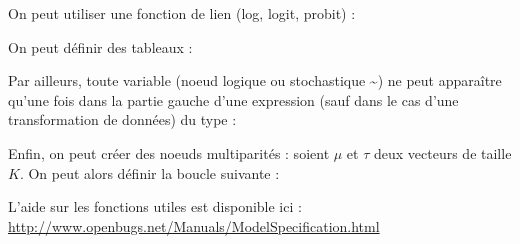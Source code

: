 On peut utiliser une fonction de lien (log, logit, probit) : \\

 \begin{center} 
 \end{center} 
 
 On peut définir des tableaux : \\
 
  \begin{center} 
 \end{center} 
 
Par ailleurs, toute variable (noeud logique ou stochastique \textasciitilde ) ne peut apparaître qu'une fois dans la partie gauche d'une expression (sauf dans le cas d'une transformation de données) du type :
 
   \begin{center} 
 \end{center} 
 
 Enfin, on peut créer des noeuds multiparités : soient $\mu$ et $\tau$ deux vecteurs de taille $K$. On peut alors définir la boucle suivante :
 
    \begin{center} 
 \end{center} 

L'aide sur les fonctions utiles est disponible ici : \url{http://www.openbugs.net/Manuals/ModelSpecification.html} \\

